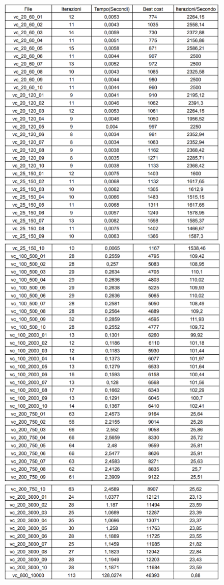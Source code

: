 \documentclass[12pt,a4paper,twoside]{article}
\begin{document}
\begin{figure}[!h]
    \centering
    \includegraphics[width=0.56\linewidth]{Graph1.png}
    \includegraphics[width=0.56\linewidth]{Graph2.png}
    \includegraphics[width=0.56\linewidth]{Graph3.png}
\end{figure}
\end{document}
